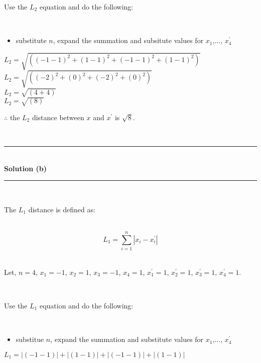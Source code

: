 \documentclass{article}
\begin{document}
\parbox{\textwidth}{Use the $L_2$ equation and do the following:}\\

\begin{itemize}
    \item {substitute $n$, expand the summation and subsitute values for $x_1$,..., $x^{\prime}_4$}\\
\end{itemize}

$L_2 = \sqrt{\left((-1 - 1)^2+(1 - 1)^2+(-1 - 1)^2+(1 - 1)^2\right)}$\\

$L_2 = \sqrt{\left((-2)^2+(0)^2+(-2)^2+(0)^2\right)}$\\

$L_2 = \sqrt{\left(4+4\right)}$\\

$L_2 = \sqrt{\left(8\right)}$\\

\parbox{\textwidth}{$\therefore$ the $L_2$ distance between $x$ and $x^{\prime}$ is $\sqrt{8}$.}\\

\noindent\rule{\textwidth}{0.4pt}\\

\textbf{Solution (b)}

\noindent\rule{\textwidth}{0.4pt}\\

\parbox{\textwidth}{The $L_1$ distance is defined as:}\\

$$L_1 = \sum_{i=1}^{n} |x_i - x^{\prime}_i|$$\\

\parbox{\textwidth}{Let, $n = 4$, $x_1 = -1$, $x_2 = 1$, $x_3 = -1$, $x_4 = 1$, $x^{\prime}_1 = 1$, $x^{\prime}_2 = 1$, $x^{\prime}_3 = 1$, $x^{\prime}_4 = 1$.}\\

\parbox{\textwidth}{Use the $L_1$ equation and do the following:}\\

\begin{itemize}
    \item {substitue $n$, expand the summation and substitute values for $x_1$,..., $x^{\prime}_4$}\\
\end{itemize}

$L_1 = |(-1 - 1)| + |(1 - 1)| + |(-1 - 1)| + |(1 - 1)|$\\
\end{document}

